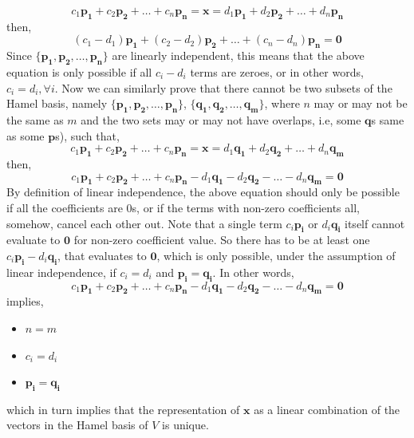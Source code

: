 	\[ c_1\mathbf{p_1} + c_2\mathbf{p_2} + \ldots + c_n\mathbf{p_n} = \mathbf{x} =  d_1\mathbf{p_1} + d_2\mathbf{p_2} + \ldots + d_n\mathbf{p_n} \]
then,
	\[ (c_1-d_1)\mathbf{p_1} + (c_2-d_2)\mathbf{p_2} + \ldots + (c_n-d_n)\mathbf{p_n} = \mathbf{0} \]
Since \( \{ \mathbf{p_1}, \mathbf{p_2}, \ldots, \mathbf{p_n} \} \) are linearly independent, this means that the above equation is only possible if all \( c_i - d_i \) terms are zeroes, or in other words, \( c_i = d_i, \forall i \). Now we can similarly prove that there cannot be two subsets of the Hamel basis, namely \( \{ \mathbf{p_1}, \mathbf{p_2}, \ldots, \mathbf{p_n} \} \), \( \{ \mathbf{q_1}, \mathbf{q_2}, \ldots, \mathbf{q_m} \} \), where \(n\) may or may not be the same as \(m\) and the two sets may or may not have overlaps, i.e, some \(\mathbf{q}\)s same as some \(\mathbf{p}\)s), such that, 
	\[ c_1\mathbf{p_1} + c_2\mathbf{p_2} + \ldots + c_n\mathbf{p_n} = \mathbf{x} =  d_1\mathbf{q_1} + d_2\mathbf{q_2} + \ldots + d_n\mathbf{q_m} \]
then,
	\[ c_1\mathbf{p_1} + c_2\mathbf{p_2} + \ldots + c_n\mathbf{p_n} - d_1\mathbf{q_1} - d_2\mathbf{q_2} - \ldots - d_n\mathbf{q_m} = \mathbf{0} \]
By definition of linear independence, the above equation should only be possible if all the coefficients are \(0\)s, or if the terms with non-zero coefficients all, somehow, cancel each other out. Note that a single term \(c_i\mathbf{p_i}\) or \(d_i\mathbf{q_i}\) itself cannot evaluate to \(\mathbf{0}\) for non-zero coefficient value. So there has to be at least one  \(c_i\mathbf{p_i} - d_i\mathbf{q_i}\), that evaluates to \(\mathbf{0}\), which is only possible, under the assumption of linear independence, if \(c_i = d_i\) and \(\mathbf{p_i} = \mathbf{q_i}\). In other words, 
	\[ c_1\mathbf{p_1} + c_2\mathbf{p_2} + \ldots + c_n\mathbf{p_n} - d_1\mathbf{q_1} - d_2\mathbf{q_2} - \ldots - d_n\mathbf{q_m} = \mathbf{0} \]
implies,
	\begin{itemize}
	\item \(n = m\)
	\item \(c_i = d_i\) 
	\item \(\mathbf{p_i} = \mathbf{q_i}\)
	\end{itemize}
which in turn implies that the representation of \(\mathbf{x}\) as a linear combination of the vectors in the Hamel basis of \(V\) is unique.

